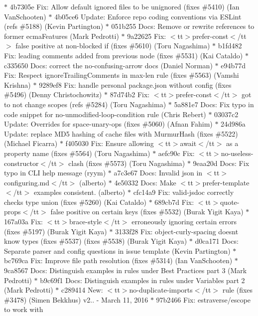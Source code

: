 \begin{DoxyItemize}
\texorpdfstring{$\ast$}{*} 4b7305e Fix\+: Allow default ignored files to be unignored (fixes \#5410) (\+Ian Van\+Schooten) \texorpdfstring{$\ast$}{*} 4b05ce6 Update\+: Enforce repo coding conventions via ESLint (refs \#5188) (\+Kevin Partington) \texorpdfstring{$\ast$}{*} 051b255 Docs\+: Remove or rewrite references to former ecma\+Features (\+Mark Pedrotti) \texorpdfstring{$\ast$}{*} 9a22625 Fix\+: $<$tt$>$prefer-\/const$<$/tt$>$ false positive at non-\/blocked if (fixes \#5610) (\+Toru Nagashima) \texorpdfstring{$\ast$}{*} b1fd482 Fix\+: leading comments added from previous node (fixes \#5531) (\+Kai Cataldo) \texorpdfstring{$\ast$}{*} c335650 Docs\+: correct the no-\/confusing-\/arrow docs (\+Daniel Norman) \texorpdfstring{$\ast$}{*} e94b77d Fix\+: Respect \textquotesingle{}ignore\+Trailing\+Comments\textquotesingle{} in max-\/len rule (fixes \#5563) (\+Vamshi Krishna) \texorpdfstring{$\ast$}{*} 9289ef8 Fix\+: handle personal package.\+json without config (fixes \#5496) (\+Denny Christochowitz) \texorpdfstring{$\ast$}{*} 87d74b2 Fix\+: $<$tt$>$prefer-\/const$<$/tt$>$ got to not change scopes (refs \#5284) (\+Toru Nagashima) \texorpdfstring{$\ast$}{*} 5a881e7 Docs\+: Fix typo in code snippet for no-\/unmodified-\/loop-\/condition rule (\+Chris Rebert) \texorpdfstring{$\ast$}{*} 03037c2 Update\+: Overrides for space-\/unary-\/ops (fixes \#5060) (\+Afnan Fahim) \texorpdfstring{$\ast$}{*} 24d986a Update\+: replace MD5 hashing of cache files with Murmur\+Hash (fixes \#5522) (\+Michael Ficarra) \texorpdfstring{$\ast$}{*} f405030 Fix\+: Ensure allowing $<$tt$>$await$<$/tt$>$ as a property name (fixes \#5564) (\+Toru Nagashima) \texorpdfstring{$\ast$}{*} aefc90c Fix\+: $<$tt$>$no-\/useless-\/constructor$<$/tt$>$ clash (fixes \#5573) (\+Toru Nagashima) \texorpdfstring{$\ast$}{*} 9eaa20d Docs\+: Fix typo in CLI help message (ryym) \texorpdfstring{$\ast$}{*} a7c3e67 Docs\+: Invalid json in $<$tt$>$configuring.\+md$<$/tt$>$ (alberto) \texorpdfstring{$\ast$}{*} 4e50332 Docs\+: Make $<$tt$>$prefer-\/template$<$/tt$>$ examples consistent. (alberto) \texorpdfstring{$\ast$}{*} cfc14a9 Fix\+: valid-\/jsdoc correctly checks type union (fixes \#5260) (\+Kai Cataldo) \texorpdfstring{$\ast$}{*} 689cb7d Fix\+: $<$tt$>$quote-\/props$<$/tt$>$ false positive on certain keys (fixes \#5532) (\+Burak Yigit Kaya) \texorpdfstring{$\ast$}{*} 167a03a Fix\+: $<$tt$>$brace-\/style$<$/tt$>$ erroneously ignoring certain errors (fixes \#5197) (\+Burak Yigit Kaya) \texorpdfstring{$\ast$}{*} 3133f28 Fix\+: object-\/curly-\/spacing doesn\textquotesingle{}t know types (fixes \#5537) (fixes \#5538) (\+Burak Yigit Kaya) \texorpdfstring{$\ast$}{*} d0ca171 Docs\+: Separate parser and config questions in issue template (\+Kevin Partington) \texorpdfstring{$\ast$}{*} bc769ca Fix\+: Improve file path resolution (fixes \#5314) (\+Ian Van\+Schooten) \texorpdfstring{$\ast$}{*} 9ca8567 Docs\+: Distinguish examples in rules under Best Practices part 3 (\+Mark Pedrotti) \texorpdfstring{$\ast$}{*} b9c69f1 Docs\+: Distinguish examples in rules under Variables part 2 (\+Mark Pedrotti) \texorpdfstring{$\ast$}{*} c289414 New\+: $<$tt$>$no-\/duplicate-\/imports$<$/tt$>$ rule (fixes \#3478) (\+Simen Bekkhus)  v2.. -\/ March 11, 2016  \texorpdfstring{$\ast$}{*} 97b2466 Fix\+: estraverse/escope to work with 
\end{DoxyItemize}

